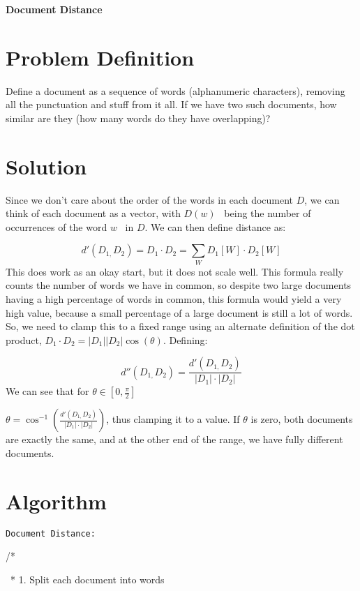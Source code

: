 \documentclass[letterpaper]{article}
\title{}
\author{}
\date{2021-06-01}
\begin{document}
{\centering\sffamily\bfseries
Document Distance
\par}

\section{Problem Definition}
Define a document as a sequence of words (alphanumeric characters), removing all the punctuation and stuff from it all.
If we have two such documents, how similar are they (how many words do they have overlapping)?

\section{Solution}
Since we don't care about the order of the words in each document  $D$, we can think of each document as a vector, with 
$D(w)$ \ being the number of occurrences of the word  $w$ \ in  $D$. We can then define distance as:

\begin{equation*}
d'(D_{1,}D_2)=D_1\cdot D_2=\sum _WD_1[W]\cdot D_2[W]
\end{equation*}
This does work as an okay start, but it does not scale well. This formula really counts the number of words we have in
common, so despite two large documents having a high percentage of words in common, this formula would yield a very
high value, because a small percentage of a large document is still a lot of words. So, we need to clamp this to a
fixed range using an alternate definition of the dot product,  $D_1\cdot D_2=|D_1||D_2|\cos (\theta )$. Defining:

\begin{equation*}
d''(D_{1,}D_2)=\frac{d'(D_{1,}D_2)}{|D_1|\cdot |D_2|}
\end{equation*}
We can see that for  $\theta \in [0,\frac{\pi } 2]$

 $\theta =\cos ^{-1}\left(\frac{d'(D_{1,}D_2)}{|D_1|\cdot |D_2|}\right)$, thus clamping it to a value. If  $\theta $ is
zero, both documents are exactly the same, and at the other end of the range, we have fully different documents.

\clearpage
\bigskip

\section{Algorithm}
\texttt{Document Distance:}

{\ttfamily
/* }

{\ttfamily
\ * 1. Split each document into words}
\end{document}
